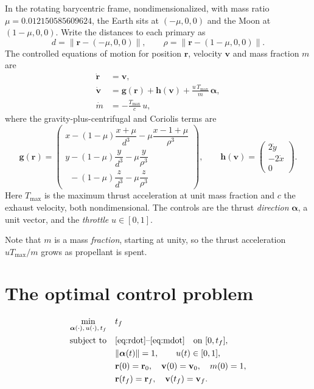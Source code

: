 \documentclass[11pt]{article}
\newcommand{\vecr}{\mathbf{r}}
\newcommand{\vecv}{\mathbf{v}}
\newcommand{\bal}{\boldsymbol{\alpha}}
\begin{document}
In the rotating barycentric frame, nondimensionalized, with mass ratio
$\mu = 0.012150585609624$, the Earth sits at $(-\mu,0,0)$ and the Moon at
$(1-\mu,0,0)$. Write the distances to each primary as
\[
  d = \lVert \vecr - (-\mu,0,0) \rVert, \qquad
  \rho = \lVert \vecr - (1-\mu,0,0) \rVert .
\]
The controlled equations of motion for position $\vecr$, velocity $\vecv$ and
mass fraction $m$ are
\begin{align}
  \dot{\vecr} &= \vecv, \label{eq:rdot}\\
  \dot{\vecv} &= \mathbf{g}(\vecr) + \mathbf{h}(\vecv)
                 + \frac{u\,T_{\max}}{m}\,\bal, \label{eq:vdot}\\
  \dot{m}     &= -\frac{T_{\max}}{c}\,u, \label{eq:mdot}
\end{align}
where the gravity-plus-centrifugal and Coriolis terms are
\[
  \mathbf{g}(\vecr) =
  \begin{pmatrix}
    x - (1-\mu)\dfrac{x+\mu}{d^3} - \mu\dfrac{x-1+\mu}{\rho^3}\\[2mm]
    y - (1-\mu)\dfrac{y}{d^3} - \mu\dfrac{y}{\rho^3}\\[2mm]
    \phantom{y} - (1-\mu)\dfrac{z}{d^3} - \mu\dfrac{z}{\rho^3}
  \end{pmatrix},
  \qquad
  \mathbf{h}(\vecv) = \begin{pmatrix} 2\dot y \\ -2\dot x \\ 0 \end{pmatrix}.
\]
Here $T_{\max}$ is the maximum thrust acceleration at unit mass fraction and $c$
the exhaust velocity, both nondimensional. The controls are the thrust
\emph{direction} $\bal$, a unit vector, and the \emph{throttle} $u \in [0,1]$.

Note that $m$ is a mass \emph{fraction}, starting at unity, so the thrust
acceleration $u T_{\max}/m$ grows as propellant is spent.

\section{The optimal control problem}

\begin{equation}
\begin{aligned}
  \min_{\bal(\cdot),\,u(\cdot),\,t_f} \quad & t_f \\
  \text{subject to}\quad
   & \eqref{eq:rdot}\text{--}\eqref{eq:mdot} \quad \text{on } [0,t_f], \\
   & \lVert \bal(t) \rVert = 1, \qquad u(t) \in [0,1], \\
   & \vecr(0) = \vecr_0,\quad \vecv(0) = \vecv_0,\quad m(0) = 1, \\
   & \vecr(t_f) = \vecr_f,\quad \vecv(t_f) = \vecv_f .
\end{aligned}
\label{eq:ocp}
\end{equation}
\end{document}
